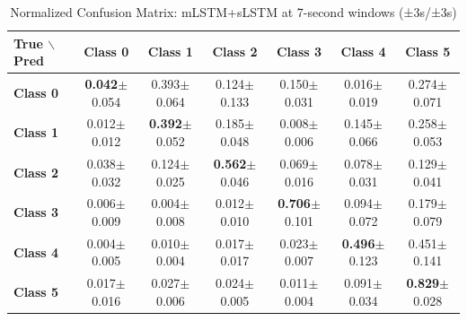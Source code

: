 \begin{table}[htbp]
\centering
\caption{Normalized Confusion Matrix: mLSTM+sLSTM at 7-second windows (±3s/±3s)}
\label{tab:app_cm_combined_7s}
\small
\setlength{\tabcolsep}{2pt}
\begin{tabular}{lcccccc}
	\toprule
	\textbf{True $\backslash$ Pred} & \textbf{Class 0} & \textbf{Class 1} & \textbf{Class 2} & \textbf{Class 3} & \textbf{Class 4} & \textbf{Class 5} \\
\midrule
	\textbf{Class 0} & \textbf{0.042}$\pm$0.054 & 0.393$\pm$0.064 & 0.124$\pm$0.133 & 0.150$\pm$0.031 & 0.016$\pm$0.019 & 0.274$\pm$0.071 \\
	\textbf{Class 1} & 0.012$\pm$0.012 & \textbf{0.392}$\pm$0.052 & 0.185$\pm$0.048 & 0.008$\pm$0.006 & 0.145$\pm$0.066 & 0.258$\pm$0.053 \\
	\textbf{Class 2} & 0.038$\pm$0.032 & 0.124$\pm$0.025 & \textbf{0.562}$\pm$0.046 & 0.069$\pm$0.016 & 0.078$\pm$0.031 & 0.129$\pm$0.041 \\
	\textbf{Class 3} & 0.006$\pm$0.009 & 0.004$\pm$0.008 & 0.012$\pm$0.010 & \textbf{0.706}$\pm$0.101 & 0.094$\pm$0.072 & 0.179$\pm$0.079 \\
	\textbf{Class 4} & 0.004$\pm$0.005 & 0.010$\pm$0.004 & 0.017$\pm$0.017 & 0.023$\pm$0.007 & \textbf{0.496}$\pm$0.123 & 0.451$\pm$0.141 \\
	\textbf{Class 5} & 0.017$\pm$0.016 & 0.027$\pm$0.006 & 0.024$\pm$0.005 & 0.011$\pm$0.004 & 0.091$\pm$0.034 & \textbf{0.829}$\pm$0.028 \\
\bottomrule
\end{tabular}
\setlength{\tabcolsep}{6pt}
\end{table}

